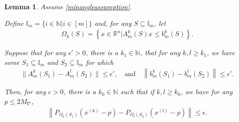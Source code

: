 \documentclass{article}
\newtheorem{lemma}[theorem]{Lemma}
\theoremstyle{case}
\numberwithin{theorem}{subsection}
\newcommand{\maxgrad}{{M_{\nabla}}}
\newcommand{\naturals}{\mathbb N}
\newcommand{\Rn}{\mathbb R^n}
\newcommand{\xk}{x^{(k)}}
\begin{document}
\begin{lemma}
\label{rename_2_2}
Assume \cref{minangleassumption}.

Define $\mathbb I_m = \{ i  \in \naturals | i \in [m] \}$
and, for any $S \subseteq \mathbb I_m$, let
\begin{align*}
\Omega_k(S) = \left\{x\in\Rn | A^k_m\left(S\right) x \le b^k_m\left(S\right)\right\}.
\end{align*}

Suppose that for any $\epsilon' > 0$, there is a $k_1\in\naturals$, that for any $k, l \ge k_1$,
we have some
$S_1 \subseteq \mathbb I_m$ and $S_2 \subseteq \mathbb I_m$
for which
\begin{align*}
\|A^k_m\left(S_1\right) - A^l_m\left(S_2\right)\| \le \epsilon', \quad \textrm{and} \quad \left\|b^k_m\left(S_1\right) - b^l_m\left(S_2\right) \right\| \le \epsilon'.
\end{align*}


Then, for any $\epsilon > 0$, there is a $k_0\in\naturals$ such that if $k, l \ge k_0$, we have for any $p \le 2\maxgrad$,
\begin{align*}
\left\| 
  P_{\Omega_k(S_1)}\left(\xk - p\right) - P_{\Omega_l(S_2)}\left(x^{(l)} - p \right)
\right\| \le \epsilon.
\end{align*}

\end{lemma}
\end{document}
